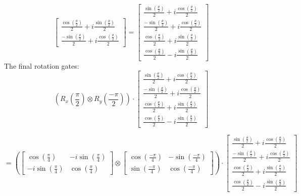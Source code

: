 \documentclass{article}
\begin{document}
\begin{itemize}
\[\begin{bmatrix}
            \frac{\cos \left(\frac{\theta}{2}\right)}{2} + i \frac{\sin \left(\frac{\theta}{2}\right)}{2} \\
            \frac{-\sin \left(\frac{\theta}{2}\right)}{2} + i \frac{\cos \left(\frac{\theta}{2}\right)}{2}
        \end{bmatrix}
        =
        \begin{bmatrix}
            \frac{\sin \left(\frac{\theta}{2}\right)}{2} + i \frac{\cos \left(\frac{\theta}{2}\right)}{2} \\
            \frac{-\sin \left(\frac{\theta}{2}\right)}{2} + i \frac{\cos \left(\frac{\theta}{2}\right)}{2} \\
            \frac{\cos \left(\frac{\theta}{2}\right)}{2} + i \frac{\sin \left(\frac{\theta}{2}\right)}{2} \\
            \frac{\cos \left(\frac{\theta}{2}\right)}{2} - i \frac{\sin \left(\frac{\theta}{2}\right)}{2} 
        \end{bmatrix}
    \]
    The final rotation gates:
    \[\left(R_x(\frac{\pi}{2}) \otimes R_y(\frac{-\pi}{2})\right) \cdot 
    \begin{bmatrix}
        \frac{\sin \left(\frac{\theta}{2}\right)}{2} + i \frac{\cos \left(\frac{\theta}{2}\right)}{2} \\
        \frac{-\sin \left(\frac{\theta}{2}\right)}{2} + i \frac{\cos \left(\frac{\theta}{2}\right)}{2} \\
        \frac{\cos \left(\frac{\theta}{2}\right)}{2} + i \frac{\sin \left(\frac{\theta}{2}\right)}{2} \\
        \frac{\cos \left(\frac{\theta}{2}\right)}{2} - i \frac{\sin \left(\frac{\theta}{2}\right)}{2} 
    \end{bmatrix}
    \]

    \[
        =
        \left(
        \begin{bmatrix}
            \cos \left(\frac{\pi}{4}\right) & -i \sin \left(\frac{\pi}{4}\right) \\
            -i \sin \left(\frac{\pi}{4}\right) & \cos \left(\frac{\pi}{4}\right)
        \end{bmatrix}
        \otimes
        \begin{bmatrix}
            \cos \left(\frac{-\pi}{4}\right) & - \sin \left(\frac{-\pi}{4}\right) \\
            \sin \left(\frac{-\pi}{4}\right) & \cos \left(\frac{-\pi}{4}\right)
        \end{bmatrix}
        \right)
        \cdot
        \begin{bmatrix}
            \frac{\sin \left(\frac{\theta}{2}\right)}{2} + i \frac{\cos \left(\frac{\theta}{2}\right)}{2} \\
            \frac{-\sin \left(\frac{\theta}{2}\right)}{2} + i \frac{\cos \left(\frac{\theta}{2}\right)}{2} \\
            \frac{\cos \left(\frac{\theta}{2}\right)}{2} + i \frac{\sin \left(\frac{\theta}{2}\right)}{2} \\
            \frac{\cos \left(\frac{\theta}{2}\right)}{2} - i \frac{\sin \left(\frac{\theta}{2}\right)}{2} 
        \end{bmatrix}
    \]


\end{itemize}
\end{document}
